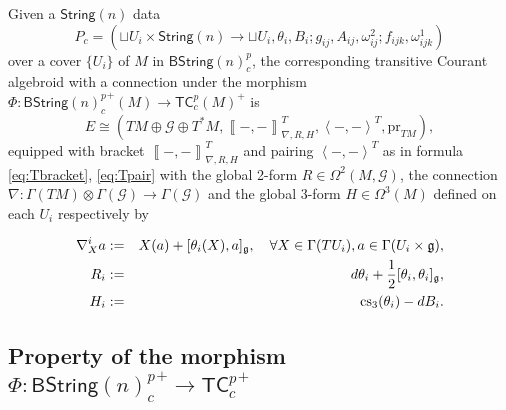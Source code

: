 \documentclass[letterpaper,10pt, oneside]{article} %
\newcommand {\emptycomment}[1]{}
\newcommand{\tcalgdp}{{\mathsf{TC}^{p}_{c}}} %
\newcommand{\tcalgdpp}{{\mathsf{TC}^{p}_{c}}^+} %
\newcommand{\bstringnp}{\mathsf{BString}(n)^p_{c}} %
\newcommand{\bstringnpp}{{\mathsf{BString}(n)^p_{c}}^+} %
\newcommand{\String}{\mathsf{String}}%
\newcommand{\cs}{\mathrm{cs}}
\newcommand{\huaG}{\mathcal{G}}
\newcommand{\frkX}{\mathfrak X}
\newcommand{\half}{\frac{1}{2}}
\newcommand{\pair}[1]{\left\langle #1\right\rangle}
\newcommand{\Courant}[1]{\left\llbracket  #1\right\rrbracket }
\newcommand{\pr}{\mathrm{pr}}
\begin{document}
\emptycomment{
By the discussion in Appendix \ref{GluingCA}, any object in ${\tcalgdpp(M)}$ takes a
form of $$(TM\oplus \huaG\oplus
T^*M, \Courant{-,-}^T_{\nabla,R,H}, \pair{-,-}^T, \pr_{TM}).$$ Furthermore, Corollary \ref{Functor} directly leads to the following fact:} Given a $\String(n)$ data
$$P_{c}=(\sqcup U_i\times \String(n)\to \sqcup U_i, \theta_i, B_i;g_{ij}, A_{ij}, \omega^2_{ij}; f_{ijk}, \omega^1_{ijk})$$
over a cover $\{U_i\}$ of $M$ in $\bstringnp$, the corresponding transitive Courant algebroid with a connection under the morphism $\Phi:{\bstringnp}^+(M)\rightarrow {\tcalgdp(M)}^+$ is
$$E\cong (TM\oplus \huaG\oplus T^*M, \Courant{-,-}^T_{\nabla,R,H}, \pair{-,-}^T, \pr_{TM}),$$
equipped with  bracket $\Courant{-,-}^T_{\nabla,R,H}$ and pairing $\pair{-,-}^T$ as in formula \eqref{eq:Tbracket}, \eqref{eq:Tpair} with  the global 2-form $R\in \Omega^2(M, \huaG)$, the connection $\nabla:\Gamma(TM)\otimes \Gamma(\huaG)\longrightarrow \Gamma(\huaG)$  and the global $3$-form $H\in \Omega^3(M)$ defined on each $U_i$ respectively by
\emptycomment{
\begin{eqnarray*}
    \nonumber\Courant{X+a+\xi,Y+b+\eta}^T_{\nabla,R,H}&=&[X,Y]+\nabla_Xb-\nabla_Ya+[a,b]_\huaG+R(X,Y)\\
  &&+L_X\eta-i_Yd\xi+P(a,b)-2Q(X,b)+2Q(y,a)+H(X,Y),\\
  \pair{X+a+\xi,Y+b+\eta}^T&=&\half\big(\xi(Y)+\eta(X)\big)+(a,b)^\huaG.
\end{eqnarray*}}
\begin{eqnarray*}
\nabla^i_Xa &:=&X(a)+[\theta_i(X),a]_\g, \quad \forall X\in\Gamma(TU_i), a\in\Gamma(U_i\times \g), \\
R_i &:=& d\theta_i + \half [\theta_i, \theta_i]_\g, \\
 H_i&:=&\cs_3(\theta_i)-dB_i.
\end{eqnarray*}
\emptycomment{
and $P:\Gamma(\huaG)\otimes \Gamma(\huaG)\longrightarrow\Omega^1(M)$ and $Q:\frkX(M)\otimes \Gamma(\huaG)\longrightarrow\Omega^1(M)$ are given by
\begin{eqnarray*}
  P(a,b)(Y)&=&2(b,\nabla_Ya)^\huaG,\\
  Q(X,a)(Y)&=&(a,R(X,Y))^\huaG.
\end{eqnarray*}}



\subsection{Property of the morphism $\Phi: \bstringnpp \to \tcalgdpp$}
\end{document}
